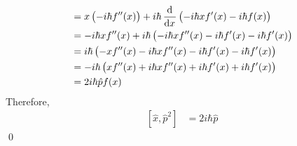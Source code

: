 \documentclass[fleqn, a4paper, 11pt, oneside]{amsart}
\theoremstyle{definition}
\theoremstyle{theorem}
\begin{document}
\begin{question}
\begin{enumerate}[leftmargin=*]
\begin{align*}
                                                                     & = x \left( -i \hbar f''(x) \right) + i \hbar \dod{}{x} \left( -i \hbar x f'(x) - i \hbar f(x) \right)                           \\
                                                                     & = -i \hbar x f''(x) + i \hbar \left( -i \hbar x f''(x) - i \hbar f'(x) - i \hbar f'(x) \right)                                  \\
                                                                     & = i \hbar \left( -x f''(x) - i \hbar x f''(x) - i \hbar f'(x) - i \hbar f'(x)  \right)                                          \\
                                                                     & = -i \hbar \left( x f''(x) + i \hbar x f''(x) + i \hbar f'(x) + i \hbar f'(x)  \right)                                          \\
                                                                     & = 2 i \hbar \hat{p} f(x)
			\end{align*}
			Therefore,
			\begin{align*}
				\left[ \hat{x},\hat{p}^2 \right] & = 2 i \hbar \hat{p}
			\end{align*}
			\qed
	\end{enumerate}
\end{question}
\end{document}

